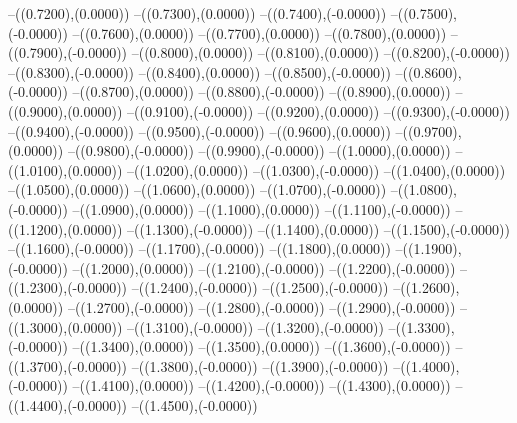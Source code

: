 {	--({\sx*(0.7200)},{\sy*(0.0000)})
	--({\sx*(0.7300)},{\sy*(0.0000)})
	--({\sx*(0.7400)},{\sy*(-0.0000)})
	--({\sx*(0.7500)},{\sy*(-0.0000)})
	--({\sx*(0.7600)},{\sy*(0.0000)})
	--({\sx*(0.7700)},{\sy*(0.0000)})
	--({\sx*(0.7800)},{\sy*(0.0000)})
	--({\sx*(0.7900)},{\sy*(-0.0000)})
	--({\sx*(0.8000)},{\sy*(0.0000)})
	--({\sx*(0.8100)},{\sy*(0.0000)})
	--({\sx*(0.8200)},{\sy*(-0.0000)})
	--({\sx*(0.8300)},{\sy*(-0.0000)})
	--({\sx*(0.8400)},{\sy*(0.0000)})
	--({\sx*(0.8500)},{\sy*(-0.0000)})
	--({\sx*(0.8600)},{\sy*(-0.0000)})
	--({\sx*(0.8700)},{\sy*(0.0000)})
	--({\sx*(0.8800)},{\sy*(-0.0000)})
	--({\sx*(0.8900)},{\sy*(0.0000)})
	--({\sx*(0.9000)},{\sy*(0.0000)})
	--({\sx*(0.9100)},{\sy*(-0.0000)})
	--({\sx*(0.9200)},{\sy*(0.0000)})
	--({\sx*(0.9300)},{\sy*(-0.0000)})
	--({\sx*(0.9400)},{\sy*(-0.0000)})
	--({\sx*(0.9500)},{\sy*(-0.0000)})
	--({\sx*(0.9600)},{\sy*(0.0000)})
	--({\sx*(0.9700)},{\sy*(0.0000)})
	--({\sx*(0.9800)},{\sy*(-0.0000)})
	--({\sx*(0.9900)},{\sy*(-0.0000)})
	--({\sx*(1.0000)},{\sy*(0.0000)})
	--({\sx*(1.0100)},{\sy*(0.0000)})
	--({\sx*(1.0200)},{\sy*(0.0000)})
	--({\sx*(1.0300)},{\sy*(-0.0000)})
	--({\sx*(1.0400)},{\sy*(0.0000)})
	--({\sx*(1.0500)},{\sy*(0.0000)})
	--({\sx*(1.0600)},{\sy*(0.0000)})
	--({\sx*(1.0700)},{\sy*(-0.0000)})
	--({\sx*(1.0800)},{\sy*(-0.0000)})
	--({\sx*(1.0900)},{\sy*(0.0000)})
	--({\sx*(1.1000)},{\sy*(0.0000)})
	--({\sx*(1.1100)},{\sy*(-0.0000)})
	--({\sx*(1.1200)},{\sy*(0.0000)})
	--({\sx*(1.1300)},{\sy*(-0.0000)})
	--({\sx*(1.1400)},{\sy*(0.0000)})
	--({\sx*(1.1500)},{\sy*(-0.0000)})
	--({\sx*(1.1600)},{\sy*(-0.0000)})
	--({\sx*(1.1700)},{\sy*(-0.0000)})
	--({\sx*(1.1800)},{\sy*(0.0000)})
	--({\sx*(1.1900)},{\sy*(-0.0000)})
	--({\sx*(1.2000)},{\sy*(0.0000)})
	--({\sx*(1.2100)},{\sy*(-0.0000)})
	--({\sx*(1.2200)},{\sy*(-0.0000)})
	--({\sx*(1.2300)},{\sy*(-0.0000)})
	--({\sx*(1.2400)},{\sy*(-0.0000)})
	--({\sx*(1.2500)},{\sy*(-0.0000)})
	--({\sx*(1.2600)},{\sy*(0.0000)})
	--({\sx*(1.2700)},{\sy*(-0.0000)})
	--({\sx*(1.2800)},{\sy*(-0.0000)})
	--({\sx*(1.2900)},{\sy*(-0.0000)})
	--({\sx*(1.3000)},{\sy*(0.0000)})
	--({\sx*(1.3100)},{\sy*(-0.0000)})
	--({\sx*(1.3200)},{\sy*(-0.0000)})
	--({\sx*(1.3300)},{\sy*(-0.0000)})
	--({\sx*(1.3400)},{\sy*(0.0000)})
	--({\sx*(1.3500)},{\sy*(0.0000)})
	--({\sx*(1.3600)},{\sy*(-0.0000)})
	--({\sx*(1.3700)},{\sy*(-0.0000)})
	--({\sx*(1.3800)},{\sy*(-0.0000)})
	--({\sx*(1.3900)},{\sy*(-0.0000)})
	--({\sx*(1.4000)},{\sy*(-0.0000)})
	--({\sx*(1.4100)},{\sy*(0.0000)})
	--({\sx*(1.4200)},{\sy*(-0.0000)})
	--({\sx*(1.4300)},{\sy*(0.0000)})
	--({\sx*(1.4400)},{\sy*(-0.0000)})
	--({\sx*(1.4500)},{\sy*(-0.0000)})
}
